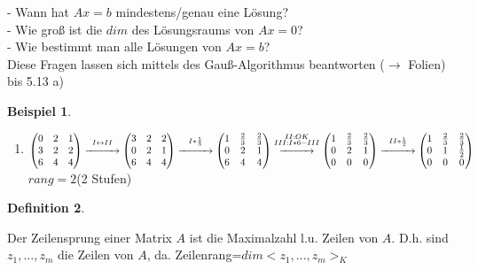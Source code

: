 \documentclass[a4paper,11pt]{article}
\newtheorem{definition}{Definition}[section]
\newtheorem{bsp}[definition]{Beispiel}
\begin{document}
- Wann hat $Ax=b$ mindestens/genau eine Lösung? \\
- Wie groß ist die $dim$ des Lösungsraums von $Ax=0$? \\
- Wie bestimmt man alle Lösungen von $Ax=b$? \\
Diese Fragen lassen sich mittels des Gauß-Algorithmus beantworten ($\rightarrow$ Folien) bis 5.13 a)
\setcounter{definition}{12}
\begin{bsp}
\end{bsp}
\begin{enumerate}[label=\alph*),start=1]
\item $\begin{pmatrix}0&2&1\\3&2&2\\6&4&4\end{pmatrix}\overset{I\leftrightarrow II}{\xrightarrow{\hspace*{1cm}}}\begin{pmatrix}3&2&2\\0&2&1\\6&4&4\end{pmatrix}\overset{I*\frac{1}{3}}{\xrightarrow{\hspace*{1cm}}}\begin{pmatrix}1&\frac{2}{3}&\frac{2}{3}\\0&2&1\\6&4&4\end{pmatrix}\overset{\substack{II: OK\\III:I*6-III}}{\xrightarrow{\hspace*{1cm}}}\begin{pmatrix}1&\frac{2}{3}&\frac{2}{3}\\0&2&1\\0&0&0\end{pmatrix}\overset{II*\frac{1}{2}}{\xrightarrow{\hspace*{1cm}}}\begin{pmatrix}1&\frac{2}{3}&\frac{2}{3}\\0&1&\frac{1}{2}\\0&0&0\end{pmatrix}$ \\
$rang=2$\hspace{5mm}(2 Stufen)
\end{enumerate}
\begin{definition}
\end{definition}
Der Zeilensprung einer Matrix $A$ ist die Maximalzahl l.u. Zeilen von $A$. D.h. sind $z_1,...,z_m$ die Zeilen von $A$, da.  Zeilenrang=$dim<z_1,...,z_m>_K$ \\
\end{document}
